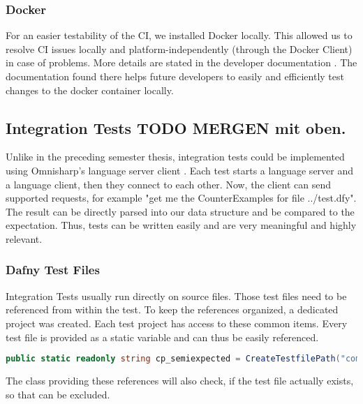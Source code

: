 {{\subsubsection{Docker}
For an easier testability of the CI, we installed Docker locally.
This allowed us to resolve CI issues locally and platform-independently (through the Docker Client) in case of problems.
More details are stated in the developer documentation \cite{dev}.
The documentation found there helps future developers to easily and efficiently test changes to the docker container locally. \\

\subsection{Integration Tests TODO MERGEN mit oben.}

\label{chapter:designTests}
Unlike in the preceding semester thesis, integration tests could be implemented using Omnisharp's language server client \cite{omnisharpClient}.
Each test starts a language server and a language client, then they connect to each other.
Now, the client can send supported requests, for example "get me the CounterExamples for file ../test.dfy".
The result can be directly parsed into our  data structure and be compared to the expectation.
Thus, tests can be written easily and are very meaningful and highly relevant.

\subsubsection{Dafny Test Files}
Integration Tests usually run directly on  source files.
Those test files need to be referenced from within the test.
To keep the references organized, a dedicated project  was created.
Each test project has access to these common items.
Every test file is provided as a static variable and can thus be easily referenced.

\begin{lstlisting}[language=csharp, caption={Test File Reference}, captionpos=b, label={lst:semiExpectedCodeThing}]
public static readonly string cp_semiexpected = CreateTestfilePath("compile/semi_expected_error.dfy");
\end{lstlisting}
The class providing these references will also check, if the test file actually exists, so that  can be excluded.

}}
